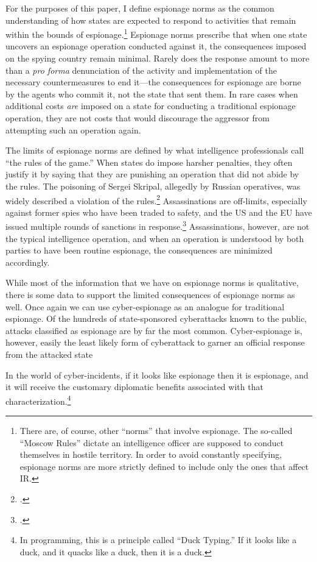 \documentclass[12pt]{extarticle}
\begin{document}
For the purposes of this paper, I define espionage norms as the common understanding of how states are expected to respond to activities that remain within the bounds of espionage.\footnote{There are, of course, other \enquote{norms} that involve espionage. The so-called \enquote{Moscow Rules} dictate an intelligence officer are supposed to conduct themselves in hostile territory. In order to avoid constantly specifying, espionage norms are more strictly defined to include only the ones that affect IR.} Espionage norms prescribe that when one state uncovers an espionage operation conducted against it, the consequences imposed on the spying country remain minimal. Rarely does the response amount to more than a \emph{pro forma} denunciation of the activity and implementation of the necessary countermeasures to end it---the consequences for espionage are borne by the agents who commit it, not the state that sent them. In rare cases when additional costs \emph{are} imposed on a state for conducting a traditional espionage operation, they are not costs that would discourage the aggressor from attempting such an operation again.

The limits of espionage norms are defined by what intelligence professionals call \enquote{the rules of the game.} When states do impose harsher penalties, they often justify it by saying that they are punishing an operation that did not abide by the rules. The poisoning of Sergei Skripal, allegedly by Russian operatives, was widely described a violation of the rules.\footcite{masters_has_2018} Assassinations are off-limits, especially against former spies who have been traded to safety, and the US and the EU have issued multiple rounds of sanctions in response.\footcite{reuters_e.u._2019} Assassinations, however, are not the typical intelligence operation, and when an operation is understood by both parties to have been routine espionage, the consequences are minimized accordingly.


While most of the information that we have on espionage norms is qualitative, there is some data to support the limited consequences of espionage norms as well. Once again we can use cyber-espionage as an analogue for traditional espionage. Of the hundreds of state-sponsored cyberattacks known to the public, attacks classified as espionage are by far the most common. Cyber-espionage is, however, easily the least likely form of cyberattack to garner an official response from the attacked state


In the world of cyber-incidents, if it looks like espionage then it is espionage, and it will receive the customary diplomatic benefits associated with that characterization.\footnote{In programming, this is a principle called \enquote{Duck Typing.} If it looks like a duck, and it quacks like a duck, then it is a duck.}
\end{document}
